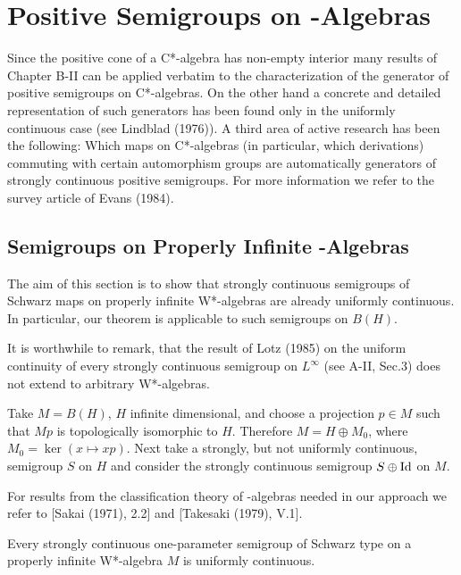 
\chapter{ Positive Semigroups on \WA-Algebras}

Since the positive cone of a C*-algebra has non-empty interior many results of Chapter B-II can be applied verbatim to the characterization of the generator of positive semigroups on C*-algebras.
On the other hand a concrete and detailed representation of such generators has been found only in the uniformly continuous case (see Lindblad (1976)).
A third area of active research has been the following: Which maps on C*-algebras (in particular, which derivations) commuting with certain automorphism groups are automatically generators of strongly continuous positive semigroups.
For more information we refer to the survey article of Evans (1984).

\section{Semigroups on Properly Infinite \WA-Algebras}

The aim of this section is to show that strongly continuous semigroups of Schwarz maps on properly infinite W*-algebras are already uniformly continuous.
In particular, our theorem is applicable to such semigroups on $B(H)$.

It is worthwhile to remark, that the result of Lotz (1985) on the uniform continuity of every strongly continuous semigroup on $L^\infty$ (see A-II, Sec.3) does not extend to arbitrary W*-algebras.
\begin{example}
Take $M = B(H)$, $H$ infinite dimensional, and choose a projection $p \in M$ such that $Mp$ is topologically isomorphic to $H$.
Therefore $M = H \oplus M_{0}$, where $M_{0} = \ker(x \mapsto xp)$.
Next take a strongly, but not uniformly continuous, semigroup $S$ on $H$ and consider the strongly continuous semigroup $S \oplus \operatorname{Id}$ on $M$.
\end{example}
For results from the classification theory of \WA-algebras needed in our approach we refer to [Sakai (1971), 2.2] and [Takesaki (1979), V.1].

\begin{theorem}\label{thm:schwarz_uniform}
Every strongly continuous one-parameter semigroup of Schwarz type on a properly infinite W*-algebra $M$ is uniformly continuous.
\end{theorem}


